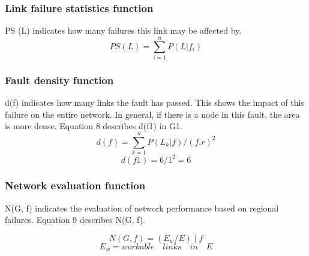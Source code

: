 \documentclass[journal]{IEEEtran}
\begin{document}
\subsubsection{Link failure statistics function} PS (L) indicates how many failures this link may be affected by.
\begin{equation}
PS (L) = \sum_{i=1}^{n} P(L|f_{i})
\end{equation}

\subsubsection{Fault density function} d(f) indicates how many links the fault has passed. This shows the impact of this failure on the entire network. In general, if there is a node in this fault, the area is more dense.
Equation 8 describes d(f1) in G1.
\begin{equation}
d(f) = \sum_{k=1}^{n}P (L_{k} | f)/(f.r)^2
\end{equation}
\begin{equation}
d(f1) = 6/1^{2} = 6
\label{d(f1)}
\end{equation}

\subsubsection{Network evaluation function} N(G, f) indicates the evaluation of network performance based on regional failures. Equation 9 describes N(G, f).

\begin{equation}
N(G,f)=(E_{w}/E)\mid f
\end{equation}
\begin{equation}
E_{w}=workable \quad links \quad in \quad E
\end{equation}
\end{document}
